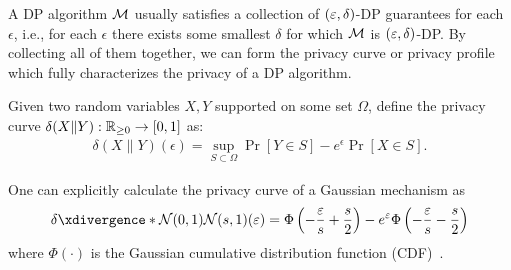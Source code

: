 

A DP algorithm $\operatorname*{\mathcal{M}}$ usually satisfies a collection of $(\varepsilon,\delta)$-DP guarantees for each $\epsilon$, i.e., for each $\epsilon$ there exists some smallest $\delta$ for which $\operatorname*{\mathcal{M}}$ is $(\varepsilon,\delta)$-DP. By collecting all of them together, we can form the privacy curve or privacy profile which fully characterizes the privacy of a DP algorithm.
\begin{definition}
Given two random variables $X,Y$ supported on some set $\Omega$, define the privacy curve $\delta(X\|Y):\mathbb{R}_{\geq 0}\rightarrow [0,1]$ as:
\begin{align*}
    \delta(X\|Y)(\epsilon)=\sup_{{S}\subset \Omega} \Pr[Y\in {S}]-e^{\epsilon}\Pr[X\in {S}].
\end{align*}
\end{definition}

One can explicitly calculate the privacy curve of a Gaussian mechanism as
\begin{equation}
\label{eqn:Gaussian_privacycurve}
   \deltacurve{\cN(0,1)}{\cN(s,1)}(\eps)= \Phi\lp -\frac{\eps}{s}+\frac{s}{2} \rp - e^\eps \Phi\lp -\frac{\eps}{s}-\frac{s}{2} \rp 
\end{equation}
 where $\Phi(\cdot)$ is the Gaussian cumulative distribution function (CDF)~\cite{BalleW18}. 


